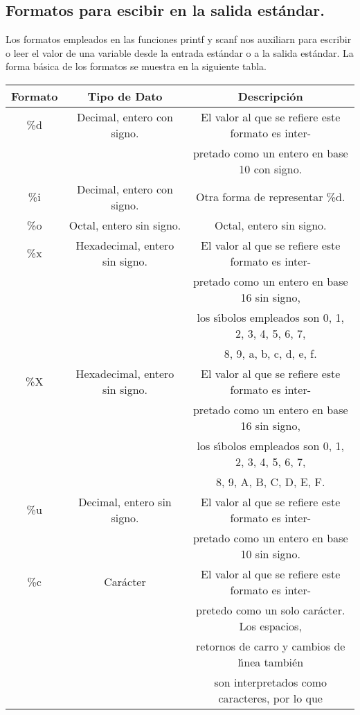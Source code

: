 \subsection{Formatos para escibir en la salida estándar.}
Los formatos empleados en las funciones printf y scanf nos auxiliarn para escribir o leer el valor de una variable desde la entrada estándar o a la salida estándar. La forma básica de los formatos se muestra en la siguiente tabla.
\begin{table}[H]
\centering
\begin{tabular}{ c | c | c }

Formato & Tipo de Dato & Descripción \\ \hline
\%d & Decimal, entero con signo. & El valor al que se refiere este formato es inter- \\ 
    & & pretado como un entero en base 10 con signo. \\ \hline
\%i & Decimal, entero con signo. & Otra forma de representar \%d.\\ \hline
\%o & Octal, entero sin signo. & Octal, entero sin signo. \\ \hline
\%x & Hexadecimal, entero sin signo. & El valor al que se refiere este formato es inter- \\ 
    & & pretado como un entero en base 16 sin signo, \\ 
    & & los sı́bolos empleados son 0, 1, 2, 3, 4, 5, 6, 7, \\ 
    & & 8, 9, a, b, c, d, e, f. \\ \hline
\%X & Hexadecimal, entero sin signo. & El valor al que se refiere este formato es inter-\\ 
    & & pretado como un entero en base 16 sin signo, \\ 
    & & los sı́bolos empleados son 0, 1, 2, 3, 4, 5, 6, 7, \\ 
    & & 8, 9, A, B, C, D, E, F. \\ \hline
\%u & Decimal, entero sin signo. & El valor al que se refiere este formato es inter- \\
    & & pretado como un entero en base 10 sin signo. \\ \hline
\%c & Carácter & El valor al que se refiere este formato es inter- \\
    & & pretedo como un solo carácter. Los espacios, \\
    & & retornos de carro y cambios de lı́nea también \\ 
    & & son interpretados como caracteres, por lo que \\ 

\end{tabular}
\end{table}
